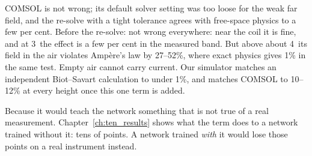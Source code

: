 \begin{defend}
COMSOL is not wrong; its default solver setting was too loose for the weak far field, and the re-solve with a tight
tolerance agrees with free-space physics to a few per cent. Before the re-solve: not wrong everywhere: near the coil it is fine, and at 3\um\ the effect is a few per cent in the measured band. But
above about 4\um\ its field in the air violates Amp\`ere's law by 27--52\%, where exact physics gives 1\% in the same
test. Empty air cannot carry current. Our simulator matches an independent Biot--Savart calculation to under 1\%, and
matches COMSOL to 10--12\% at every height once this one term is added.
\end{defend}

\begin{defend}
Because it would teach the network something that is not true of a real measurement. Chapter~\ref{ch:ten_results} shows
what the term does to a network trained without it: tens of points. A network trained \emph{with} it would lose those
points on a real instrument instead.
\end{defend}
